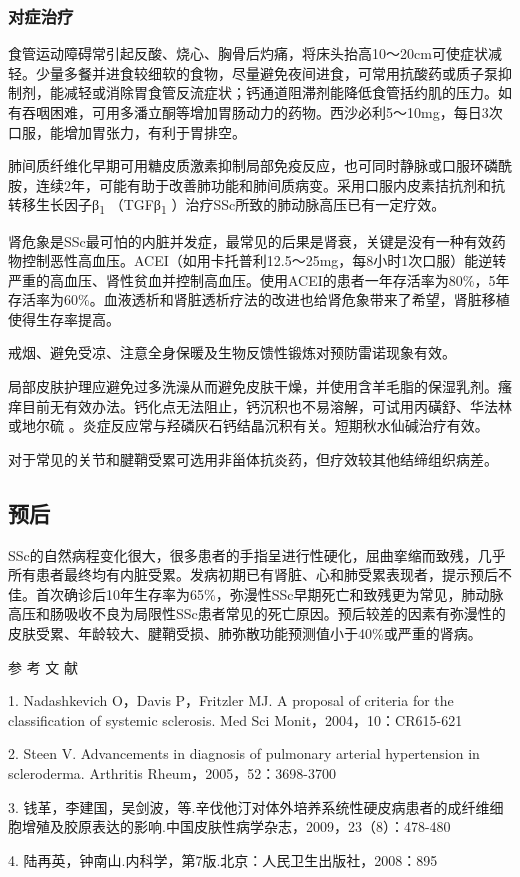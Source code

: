 \subsubsection{对症治疗}

食管运动障碍常引起反酸、烧心、胸骨后灼痛，将床头抬高10～20cm可使症状减轻。少量多餐并进食较细软的食物，尽量避免夜间进食，可常用抗酸药或质子泵抑制剂，能减轻或消除胃食管反流症状；钙通道阻滞剂能降低食管括约肌的压力。如有吞咽困难，可用多潘立酮等增加胃肠动力的药物。西沙必利5～10mg，每日3次口服，能增加胃张力，有利于胃排空。

肺间质纤维化早期可用糖皮质激素抑制局部免疫反应，也可同时静脉或口服环磷酰胺，连续2年，可能有助于改善肺功能和肺间质病变。采用口服内皮素拮抗剂和抗转移生长因子β\textsubscript{1}
（TGFβ\textsubscript{1} ）治疗SSc所致的肺动脉高压已有一定疗效。

肾危象是SSc最可怕的内脏并发症，最常见的后果是肾衰，关键是没有一种有效药物控制恶性高血压。ACEI（如用卡托普利12.5～25mg，每8小时1次口服）能逆转严重的高血压、肾性贫血并控制高血压。使用ACEI的患者一年存活率为80\%，5年存活率为60\%。血液透析和肾脏透析疗法的改进也给肾危象带来了希望，肾脏移植使得生存率提高。

戒烟、避免受凉、注意全身保暖及生物反馈性锻炼对预防雷诺现象有效。

局部皮肤护理应避免过多洗澡从而避免皮肤干燥，并使用含羊毛脂的保湿乳剂。瘙痒目前无有效办法。钙化点无法阻止，钙沉积也不易溶解，可试用丙磺舒、华法林或地尔硫{}
。炎症反应常与羟磷灰石钙结晶沉积有关。短期秋水仙碱治疗有效。

对于常见的关节和腱鞘受累可选用非甾体抗炎药，但疗效较其他结缔组织病差。

\subsection{预后}

SSc的自然病程变化很大，很多患者的手指呈进行性硬化，屈曲挛缩而致残，几乎所有患者最终均有内脏受累。发病初期已有肾脏、心和肺受累表现者，提示预后不佳。首次确诊后10年生存率为65\%，弥漫性SSc早期死亡和致残更为常见，肺动脉高压和肠吸收不良为局限性SSc患者常见的死亡原因。预后较差的因素有弥漫性的皮肤受累、年龄较大、腱鞘受损、肺弥散功能预测值小于40\%或严重的肾病。

\protect\hypertarget{text00353.html}{}{}

\hypertarget{text00353.htmlux5cux23CHP14-4-5}{}
参 考 文 献

1. Nadashkevich O，Davis P，Fritzler MJ. A proposal of criteria for the
classification of systemic sclerosis. Med Sci Monit，2004，10：CR615-621

2. Steen V. Advancements in diagnosis of pulmonary arterial hypertension
in scleroderma. Arthritis Rheum，2005，52：3698-3700

3.
钱革，李建国，吴剑波，等.辛伐他汀对体外培养系统性硬皮病患者的成纤维细胞增殖及胶原表达的影响.中国皮肤性病学杂志，2009，23（8）：478-480

4. 陆再英，钟南山.内科学，第7版.北京：人民卫生出版社，2008：895

\protect\hypertarget{text00354.html}{}{}

